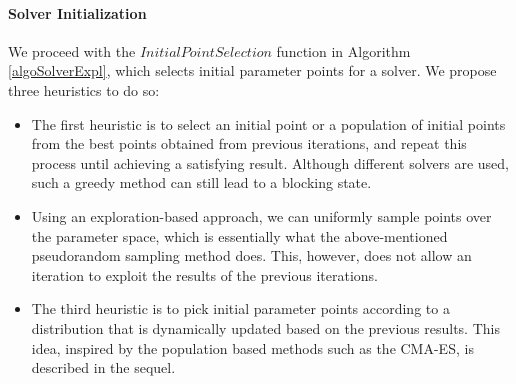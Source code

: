 \paragraph{Solver Initialization}\label{sec:init}
We proceed with the $InitialPointSelection$ function in Algorithm \ref{algoSolverExpl}, which selects initial parameter points for a solver. We propose three heuristics to do so:
\begin{itemize}
\item The first heuristic is to select an initial point or a population of initial points from the best points obtained from previous iterations, and repeat this process until achieving a satisfying result. Although different solvers are used, such a greedy method can still lead to a blocking state. 
\item Using an exploration-based approach, we can uniformly sample points over the parameter space, which is essentially what the above-mentioned pseudorandom sampling method does. This, however, does not allow an iteration to exploit the results of the previous iterations. 
\item The third heuristic is to pick initial parameter points according to a distribution that is dynamically updated based on the previous results. This idea, inspired by the population based methods such as the CMA-ES, is described in the sequel. 
\end{itemize}

